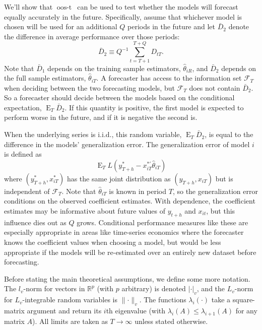 \documentclass[11pt]{article}
\DeclareMathOperator{\E}{E}
\newcommand{\oost}{\ensuremath{\operatorname{oos-t}}}
\newcommand{\h}{h}
\renewcommand{\Re}{\ensuremath{\mathbb{R}}}
\begin{document}
We'll show that \oost\ can be used to test whether the models will
forecast equally accurately in the future.  Specifically, assume that
whichever model is chosen will be used for an additional $Q$ periods
in the future and let $\bar D_2$ denote the difference in average
performance over those periods:
\[
\bar D_2 \equiv Q^{-1} \sum_{t=T+1}^{T+Q} D_{tT}.
\]
Note that $\bar D_1$ depends on the training sample estimators,
$\hat\theta_{iR}$, and $\bar D_2$ depends on the full sample
estimators, $\hat\theta_{iT}$.  A forecaster has access to the
information set $\mathcal{F}_T$ when deciding between the two
forecasting models, but $\mathcal{F}_T$ does not contain $\bar D_2$.
So a forecaster should decide between the models based on the
conditional expectation, $\E_T \bar{D}_2$. If this quantity is
positive, the first model is expected to perform worse in the future,
and if it is negative the second is.

When the underlying series is i.i.d., this random variable, $\E_T
\bar{D}_2$, is equal to the difference in the models' generalization
error.  The generalization error of model $i$ is defined as
\begin{equation*}
  \E_{T} L(y_{T+\h}^{*} - x_{iT}^{*\prime}\hat{\theta}_{iT})
\end{equation*}
where $(y_{T+\h}^{*},x_{iT}^{*})$ has the same joint distribution as
$(y_{T+\h}, x_{iT})$ but is independent of $\mathcal{F}_T$.  Note that
$\hat{\theta}_{iT}$ is known in period $T$, so the generalization
error conditions on the observed coefficient estimates.  With
dependence, the coefficient estimates may be informative about future
values of $y_{t+\h}$ and $x_{it}$, but this influence dies out as $Q$
grows.  Conditional performance measures like these are especially
appropriate in areas like time-series economics where the forecaster
knows the coefficient values when choosing a model, but would be less
appropriate if the models will be re-estimated over an entirely new
dataset before forecasting.

Before stating the main theoretical assumptions, we define some more
notation.  The $l_v$-norm for vectors in $\Re^p$ (with $p$ arbitrary)
is denoted $\lvert \cdot \rvert_v$, and the $L_v$-norm for
$L_v$-integrable random variables is $\lVert \cdot \rVert_v$.  The
functions $\lambda_i(\cdot)$ take a square-matrix argument and return
its $i$th eigenvalue (with $\lambda_{i}(A) \leq \lambda_{i+1}(A)$ for
any matrix $A$).
All limits are taken as $T \to \infty$ unless stated otherwise.
 
\end{document}
